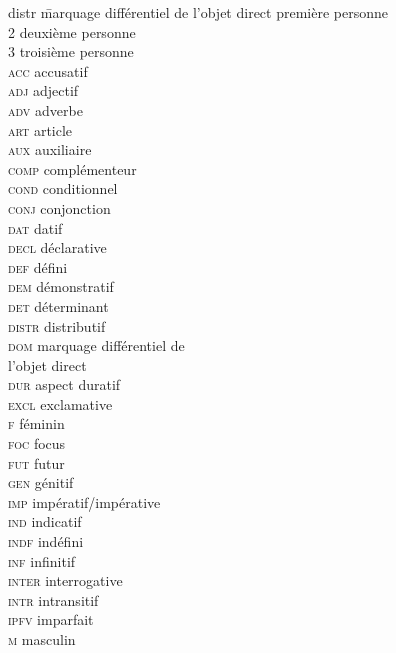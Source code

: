  
\begin{multicols}{2}
\begin{tabbing}
distr \hspace{1em} \= marquage différentiel de l’objet direct \> première personne\\
2 \> deuxième personne\\
3 \> troisième personne\\
\textsc{acc} \> accusatif\\
\textsc{adj} \> adjectif\\
\textsc{adv} \> adverbe\\
\textsc{art} \> article\\
\textsc{aux} \> auxiliaire\\
\textsc{comp} \> complémenteur\\
\textsc{cond} \> conditionnel\\
\textsc{conj} \> conjonction\\
\textsc{dat} \> datif\\
\textsc{decl} \> déclarative\\
\textsc{def} \> défini\\
\textsc{dem} \> démonstratif\\
\textsc{det} \> déterminant\\
\textsc{distr} \> distributif\\
\textsc{dom} \> marquage différentiel de \\
	\> l’objet direct\\
\textsc{dur} \> aspect duratif\\
\textsc{excl} \> exclamative\\
\textsc{f} \> féminin\\
\textsc{foc} \> focus\\
\textsc{fut} \> futur\\
\textsc{gen} \> génitif\\
\textsc{imp} \> impératif/impérative\\
\textsc{ind} \> indicatif\\
\textsc{indf} \> indéfini\\
\textsc{inf} \> infinitif\\
\textsc{inter} \> interrogative\\
\textsc{intr} \> intransitif\\
\textsc{ipfv} \> imparfait\\
\textsc{m} \> masculin\\

\end{tabbing}
\end{multicols}
